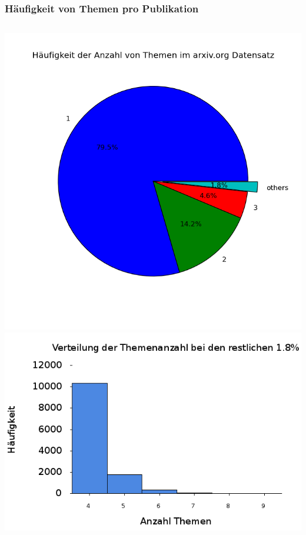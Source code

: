\documentclass[12pt, xcolor=table]{beamer}
\begin{document}
\begin{frame}
	\frametitle{Häufigkeit von Themen pro Publikation}
	\begin{columns}
    \includegraphics[scale=0.35]{../visual/piechart.png}
    \includegraphics[scale=0.25]{../visual/pieSubplot.png}
	\end{columns}
\end{frame}
\end{document}
